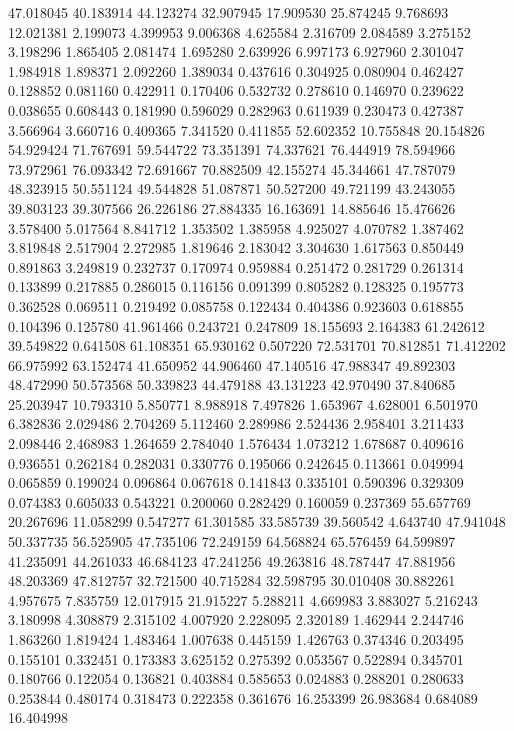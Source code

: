 47.018045
40.183914
44.123274
32.907945
17.909530
25.874245
9.768693
12.021381
2.199073
4.399953
9.006368
4.625584
2.316709
2.084589
3.275152
3.198296
1.865405
2.081474
1.695280
2.639926
6.997173
6.927960
2.301047
1.984918
1.898371
2.092260
1.389034
0.437616
0.304925
0.080904
0.462427
0.128852
0.081160
0.422911
0.170406
0.532732
0.278610
0.146970
0.239622
0.038655
0.608443
0.181990
0.596029
0.282963
0.611939
0.230473
0.427387
3.566964
3.660716
0.409365
7.341520
0.411855
52.602352
10.755848
20.154826
54.929424
71.767691
59.544722
73.351391
74.337621
76.444919
78.594966
73.972961
76.093342
72.691667
70.882509
42.155274
45.344661
47.787079
48.323915
50.551124
49.544828
51.087871
50.527200
49.721199
43.243055
39.803123
39.307566
26.226186
27.884335
16.163691
14.885646
15.476626
3.578400
5.017564
8.841712
1.353502
1.385958
4.925027
4.070782
1.387462
3.819848
2.517904
2.272985
1.819646
2.183042
3.304630
1.617563
0.850449
0.891863
3.249819
0.232737
0.170974
0.959884
0.251472
0.281729
0.261314
0.133899
0.217885
0.286015
0.116156
0.091399
0.805282
0.128325
0.195773
0.362528
0.069511
0.219492
0.085758
0.122434
0.404386
0.923603
0.618855
0.104396
0.125780
41.961466
0.243721
0.247809
18.155693
2.164383
61.242612
39.549822
0.641508
61.108351
65.930162
0.507220
72.531701
70.812851
71.412202
66.975992
63.152474
41.650952
44.906460
47.140516
47.988347
49.892303
48.472990
50.573568
50.339823
44.479188
43.131223
42.970490
37.840685
25.203947
10.793310
5.850771
8.988918
7.497826
1.653967
4.628001
6.501970
6.382836
2.029486
2.704269
5.112460
2.289986
2.524436
2.958401
3.211433
2.098446
2.468983
1.264659
2.784040
1.576434
1.073212
1.678687
0.409616
0.936551
0.262184
0.282031
0.330776
0.195066
0.242645
0.113661
0.049994
0.065859
0.199024
0.096864
0.067618
0.141843
0.335101
0.590396
0.329309
0.074383
0.605033
0.543221
0.200060
0.282429
0.160059
0.237369
55.657769
20.267696
11.058299
0.547277
61.301585
33.585739
39.560542
4.643740
47.941048
50.337735
56.525905
47.735106
72.249159
64.568824
65.576459
64.599897
41.235091
44.261033
46.684123
47.241256
49.263816
48.787447
47.881956
48.203369
47.812757
32.721500
40.715284
32.598795
30.010408
30.882261
4.957675
7.835759
12.017915
21.915227
5.288211
4.669983
3.883027
5.216243
3.180998
4.308879
2.315102
4.007920
2.228095
2.320189
1.462944
2.244746
1.863260
1.819424
1.483464
1.007638
0.445159
1.426763
0.374346
0.203495
0.155101
0.332451
0.173383
3.625152
0.275392
0.053567
0.522894
0.345701
0.180766
0.122054
0.136821
0.403884
0.585653
0.024883
0.288201
0.280633
0.253844
0.480174
0.318473
0.222358
0.361676
16.253399
26.983684
0.684089
16.404998
